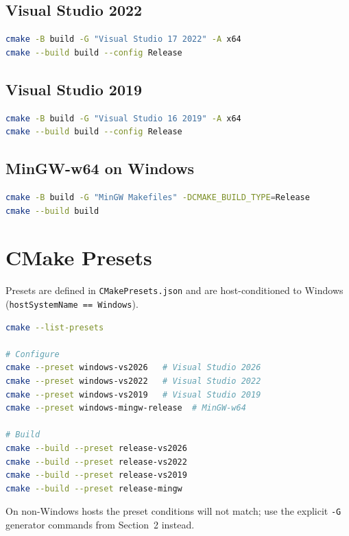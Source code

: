 \documentclass[11pt,a4paper]{article}
\begin{document}
\subsection{Visual Studio 2022}
\begin{lstlisting}[language=bash]
cmake -B build -G "Visual Studio 17 2022" -A x64
cmake --build build --config Release
\end{lstlisting}

\subsection{Visual Studio 2019}
\begin{lstlisting}[language=bash]
cmake -B build -G "Visual Studio 16 2019" -A x64
cmake --build build --config Release
\end{lstlisting}

\subsection{MinGW-w64 on Windows}
\begin{lstlisting}[language=bash]
cmake -B build -G "MinGW Makefiles" -DCMAKE_BUILD_TYPE=Release
cmake --build build
\end{lstlisting}

\section{CMake Presets}

Presets are defined in \texttt{CMakePresets.json} and are host-conditioned to
Windows (\texttt{hostSystemName == Windows}).

\begin{lstlisting}[language=bash]
cmake --list-presets

# Configure
cmake --preset windows-vs2026   # Visual Studio 2026
cmake --preset windows-vs2022   # Visual Studio 2022
cmake --preset windows-vs2019   # Visual Studio 2019
cmake --preset windows-mingw-release  # MinGW-w64

# Build
cmake --build --preset release-vs2026
cmake --build --preset release-vs2022
cmake --build --preset release-vs2019
cmake --build --preset release-mingw
\end{lstlisting}

\noindent On non-Windows hosts the preset conditions will not match; use the
explicit \texttt{-G} generator commands from Section~2 instead.
\end{document}

